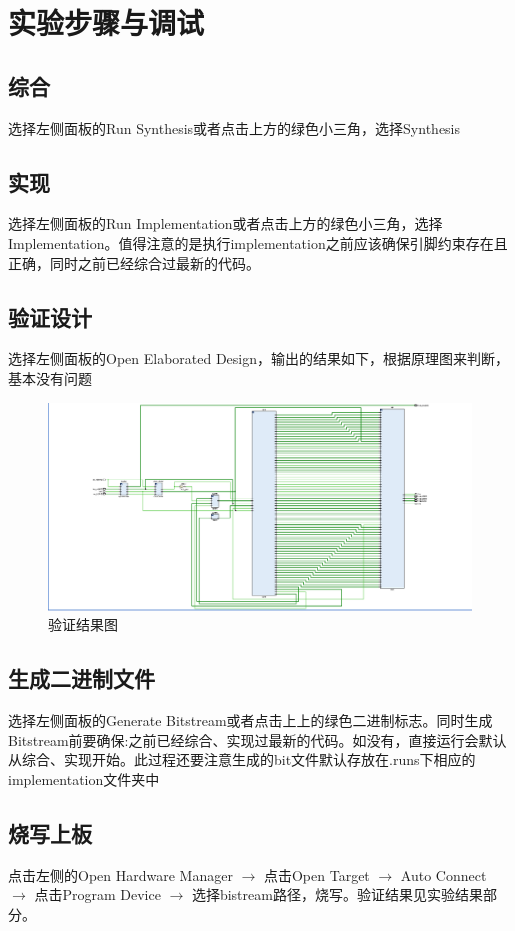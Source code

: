 
\section{实验步骤与调试}
\subsection{综合} 选择左侧面板的Run Synthesis或者点击上方的绿色小三角，选择Synthesis
\subsection{实现} 选择左侧面板的Run Implementation或者点击上方的绿色小三角，选择Implementation。值得注意的是执行implementation之前应该确保引脚约束存在且正确，同时之前已经综合过最新的代码。
\subsection{验证设计} 选择左侧面板的Open Elaborated Design，输出的结果如下，根据原理图来判断，基本没有问题
\begin{figure}[H] %
    \centering %
    \includegraphics[width=1.0\textwidth]{yanzhen.png} %
    \caption{验证结果图} %
    \label{Fig.7} %
\end{figure}
\subsection{生成二进制文件} 选择左侧面板的Generate Bitstream或者点击上上的绿色二进制标志。同时生成Bitstream前要确保:之前已经综合、实现过最新的代码。如没有，直接运行会默认从综合、实现开始。此过程还要注意生成的bit文件默认存放在.runs下相应的implementation文件夹中
\subsection{烧写上板} 点击左侧的Open Hardware Manager $\rightarrow$ 点击Open Target $\rightarrow$ Auto Connect $\rightarrow$ 点击Program Device $\rightarrow$ 选择bistream路径，烧写。验证结果见实验结果部分。
